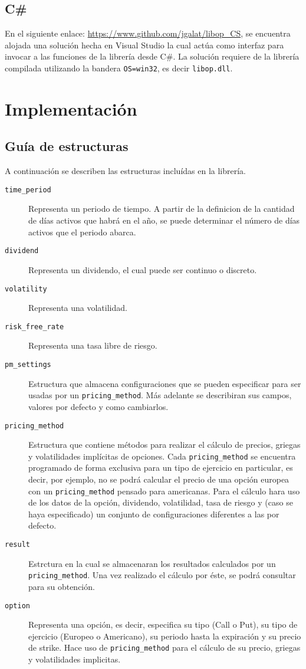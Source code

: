 \documentclass[12pt,a4paper,final]{article}
\begin{document}
	\subsection{C\#}
		En el siguiente enlace: \url{https://www.github.com/jgalat/libop_CS}, se encuentra alojada
		una solución hecha en Visual Studio la cual actúa como interfaz para invocar a las funciones
		de la librería desde C\#. La solución requiere de la librería compilada utilizando la bandera
		\texttt{OS=win32}, es decir \texttt{libop.dll}.
		
\section{Implementación}

	\subsection{Guía de estructuras}
		A continuación se describen las estructuras incluídas en la librería.
		
		\begin{description}
			\item [\texttt{time\_period}] Representa un periodo de tiempo. A partir de la definicion de 
				la cantidad de días activos que habrá en el año, se puede determinar el número
				de días activos que el periodo abarca.  
			\item [\texttt{dividend}] Representa un dividendo, el cual puede ser continuo o discreto.
			\item [\texttt{volatility}] Representa una volatilidad.
			\item [\texttt{risk\_free\_rate}] Representa una tasa libre de riesgo.
			\item [\texttt{pm\_settings}] Estructura que almacena configuraciones que se pueden
				especificar para ser usadas por un \texttt{pricing\_method}. Más adelante se describiran
				sus campos, valores por defecto y como cambiarlos.
			\item [\texttt{pricing\_method}] Estructura que contiene métodos para realizar el cálculo
				de precios, griegas y volatilidades implícitas de opciones. Cada \texttt{pricing\_method}
				se encuentra programado de forma exclusiva para un tipo de ejercicio en particular,
				es decir, por ejemplo, no se podrá calcular el precio de una opción europea con un
			\texttt{pricing\_method} pensado para americanas. Para el cálculo hara uso de los datos
				de la opción, dividendo, volatilidad, tasa de riesgo y (caso se haya especificado) un conjunto
				de configuraciones diferentes a las por defecto.
			\item [\texttt{result}]	Estrctura en la cual se almacenaran los resultados calculados por
				un \texttt{pricing\_method}. Una vez realizado el cálculo por éste, se podrá consultar para
				su obtención.
			\item [\texttt{option}] Representa una opción, es decir, especifica su tipo (Call o Put), su
				tipo de ejercicio (Europeo o Americano), su periodo hasta la expiración y su precio de
				strike. Hace uso de \texttt{pricing\_method} para el cálculo de su precio, griegas y
				volatilidades implicitas.
		\end{description}
\end{document}
